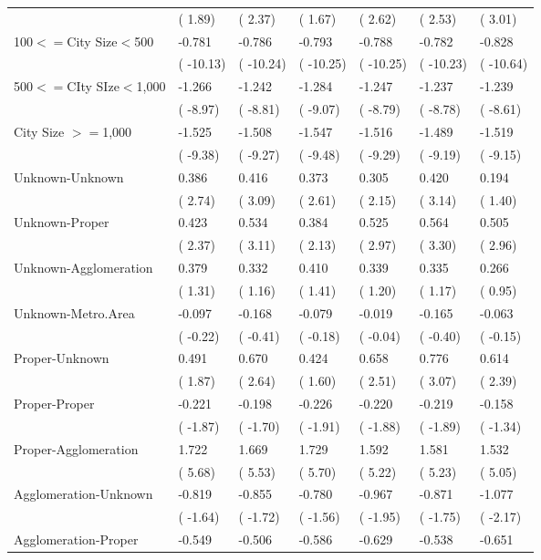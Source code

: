 \begin{center}
\begin{longtable}{}
&(   1.89)&(   2.37)&(   1.67)&(   2.62)&(   2.53)&(   3.01)\\
100$<=$City Size$<$500   & -0.781& -0.786& -0.793& -0.788& -0.782& -0.828\\
&( -10.13)&( -10.24)&( -10.25)&( -10.25)&( -10.23)&( -10.64)\\
500$<=$CIty SIze$<$1,000 & -1.266& -1.242& -1.284& -1.247& -1.237& -1.239\\
&(  -8.97)&(  -8.81)&(  -9.07)&(  -8.79)&(  -8.78)&(  -8.61)\\
City Size $>=$1,000      & -1.525& -1.508& -1.547& -1.516& -1.489& -1.519\\
&(  -9.38)&(  -9.27)&(  -9.48)&(  -9.29)&(  -9.19)&(  -9.15)\\
Unknown-Unknown          &  0.386&  0.416&  0.373&  0.305&  0.420&  0.194\\
&(   2.74)&(   3.09)&(   2.61)&(   2.15)&(   3.14)&(   1.40)\\
Unknown-Proper           &  0.423&  0.534&  0.384&  0.525&  0.564&  0.505\\
&(   2.37)&(   3.11)&(   2.13)&(   2.97)&(   3.30)&(   2.96)\\
Unknown-Agglomeration    &  0.379&  0.332&  0.410&  0.339&  0.335&  0.266\\
&(   1.31)&(   1.16)&(   1.41)&(   1.20)&(   1.17)&(   0.95)\\
Unknown-Metro.Area       & -0.097& -0.168& -0.079& -0.019& -0.165& -0.063\\
&(  -0.22)&(  -0.41)&(  -0.18)&(  -0.04)&(  -0.40)&(  -0.15)\\
Proper-Unknown           &  0.491&  0.670&  0.424&  0.658&  0.776&  0.614\\
&(   1.87)&(   2.64)&(   1.60)&(   2.51)&(   3.07)&(   2.39)\\
Proper-Proper            & -0.221& -0.198& -0.226& -0.220& -0.219& -0.158\\
&(  -1.87)&(  -1.70)&(  -1.91)&(  -1.88)&(  -1.89)&(  -1.34)\\
Proper-Agglomeration     &  1.722&  1.669&  1.729&  1.592&  1.581&  1.532\\
&(   5.68)&(   5.53)&(   5.70)&(   5.22)&(   5.23)&(   5.05)\\
Agglomeration-Unknown    & -0.819& -0.855& -0.780& -0.967& -0.871& -1.077\\
&(  -1.64)&(  -1.72)&(  -1.56)&(  -1.95)&(  -1.75)&(  -2.17)\\
Agglomeration-Proper     & -0.549& -0.506& -0.586& -0.629& -0.538& -0.651\\

\end{longtable}
\end{center}
